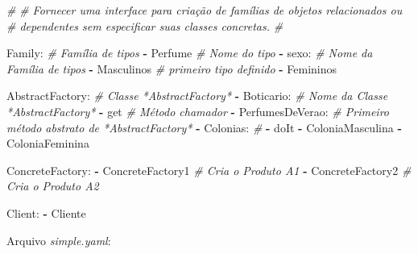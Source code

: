 \documentclass[]{article}
\newenvironment{Shaded}{}{}
\newcommand{\KeywordTok}[1]{\textcolor[rgb]{0.00,0.44,0.13}{\textbf{{#1}}}}
\newcommand{\CommentTok}[1]{\textcolor[rgb]{0.38,0.63,0.69}{\textit{{#1}}}}
\newcommand{\FunctionTok}[1]{\textcolor[rgb]{0.02,0.16,0.49}{{#1}}}
\newcommand{\NormalTok}[1]{{#1}}
\begin{document}
\begin{Shaded}
\begin{Highlighting}[]
\CommentTok{#}
\CommentTok{# Fornecer uma interface para criação de famílias de objetos relacionados ou}
\CommentTok{# dependentes sem especificar suas classes concretas.}
\CommentTok{#}

\FunctionTok{Family:}                     \CommentTok{# Família de tipos}
\KeywordTok{-} \NormalTok{Perfume                   }\CommentTok{# Nome do tipo}
\KeywordTok{-} \FunctionTok{sexo:}                     \CommentTok{# Nome da Família de tipos}
    \KeywordTok{-} \NormalTok{Masculinos            }\CommentTok{# primeiro tipo definido}
    \KeywordTok{-} \NormalTok{Femininos}

\FunctionTok{AbstractFactory:}            \CommentTok{# Classe *AbstractFactory*}
\KeywordTok{-} \FunctionTok{Boticario:}                \CommentTok{# Nome da Classe *AbstractFactory*}
    \KeywordTok{-} \NormalTok{get                   }\CommentTok{# Método chamador}
    \KeywordTok{-} \FunctionTok{PerfumesDeVerao:}      \CommentTok{# Primeiro método abstrato de *AbstractFactory*}
        \KeywordTok{-} \FunctionTok{Colonias:}         \CommentTok{#}
            \KeywordTok{-} \NormalTok{doIt}
            \KeywordTok{-} \NormalTok{ColoniaMasculina}
            \KeywordTok{-} \NormalTok{ColoniaFeminina}

\FunctionTok{ConcreteFactory:}
\KeywordTok{-} \NormalTok{ConcreteFactory1          }\CommentTok{# Cria o Produto A1}
\KeywordTok{-} \NormalTok{ConcreteFactory2          }\CommentTok{# Cria o Produto A2}

\FunctionTok{Client:}
\KeywordTok{-} \NormalTok{Cliente}
\end{Highlighting}
\end{Shaded}

\clearpage
Arquivo \emph{simple.yaml}:
\end{document}
